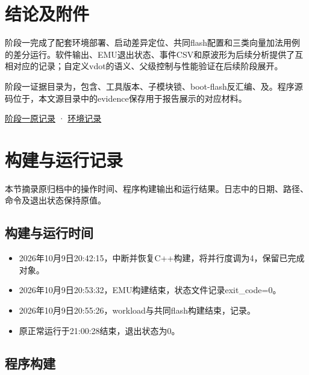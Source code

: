 \section{结论及附件}

阶段一完成了配套环境部署、启动差异定位、共同flash配置和三类向量加法用例的差分运行。软件输出、EMU退出状态、事件CSV和原波形为后续分析提供了互相对应的记录；自定义vdot的语义、父级控制与性能验证在后续阶段展开。\par

阶段一证据目录为，包含、工具版本、子模块锁、boot-flash反汇编、及。程序源码位于，本文源目录中的evidence保存用于报告展示的对应材料。\par

\href{https://github.com/cc77-builder/riscv/blob/eca41d7cd959f5f3c4f240e382919c492d1ccb96/team/docs/stage1.md}{阶段一原记录} · \href{https://github.com/cc77-builder/riscv/blob/eca41d7cd959f5f3c4f240e382919c492d1ccb96/team/docs/environment.md}{环境记录}\par

\section{构建与运行记录}
本节摘录原归档中的操作时间、程序构建输出和运行结果。日志中的日期、路径、命令及退出状态保持原值。\par

\subsection{构建与运行时间}
\begin{itemize}
\item 2026年10月9日20:42:15，中断并恢复C++构建，将并行度调为4，保留已完成对象。
\item 2026年10月9日20:53:32，EMU构建结束，状态文件记录exit\_code=0。
\item 2026年10月9日20:55:26，workload与共同flash构建结束，记录。
\item 原正常运行于21:00:28结束，退出状态为0。
\end{itemize}

\subsection{程序构建}

